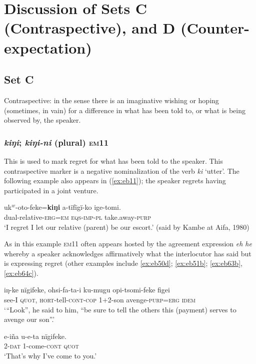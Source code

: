 \documentclass[output=paper]{langsci/langscibook}
\begin{document}
\section{Discussion of Sets C (Contraspective), and D (Counter-expectation)}\label{s:eb3}

\subsection{Set C}
Contraspective: in the sense there is an imaginative wishing or hoping  (sometimes, in vain) for a difference in what has been told to, or what is being observed by, the speaker. 

\subsubsection{\textit{kiŋi}; \textit{kiŋi-ni} (plural) \textsc{em}11} 
This is used to mark regret for what has been told to the speaker. This contraspective marker is a negative nominalization of the verb \textit{ki} ‘utter’. The following example also appears in (\ref{ex:eb11}); the speaker regrets having participated in a joint venture.

\begin{exe}
	\ex \label{ex:eb27}
	\gll uk$^w$-oto-feke=\textbf{kiŋi} a-tïfïgï-ko ige-tomi.\\
	dual-relative-\textsc{erg=em} \textsc{eqs-imp-pl} take.away-\textsc{purp}\\
	\trans `I regret I let our relative (parent) be our escort.' (said by Kambe at Aifa, 1980)
\end{exe}

As in this example \textsc{em}11 often appears hosted by the agreement expression \textit{eh he} whereby a speaker acknowledges affirmatively what the interlocutor has said but is expressing regret (other examples include \ref{ex:eb50d}; \ref{ex:eb51b}; \ref{ex:eb63b}, \ref{ex:eb64c}).

\begin{exe}
	\ex \label{ex:eb28}
	\gll iŋ-ke nïgifeke, ohsi-fa-ta-i ku-mugu opi-tsomi-feke figei\\
	see-I \textsc{quot}, \textsc{hort}-tell-\textsc{cont-cop} 1+2-son avenge-\textsc{purp=erg} \textsc{idem}\\
	\trans ‘“Look”, he said to him, “be sure to tell the others this (payment) serves to avenge our son”.’
\end{exe}

\begin{exe}
	\ex \label{ex:eb29}
	\gll e-iña u-e-ta nïgifeke.\\
	2-\textsc{dat} 1-come-\textsc{cont} \textsc{quot}\\
	\trans `That’s why I’ve come to you.'  
\end{exe}
\end{document}
